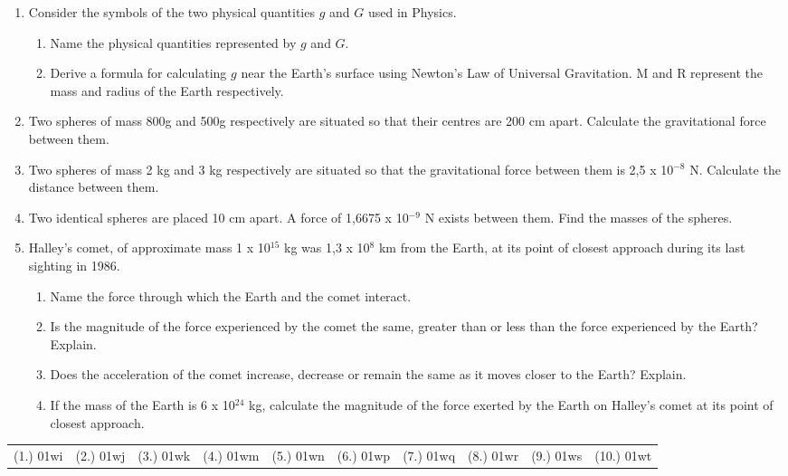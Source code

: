 {\begin{enumerate}
\item {Consider the symbols of the two physical quantities $g$ and $G$ used in Physics.
\begin{enumerate}
\item Name the physical quantities represented by $g$ and $G$.
\item Derive a formula for calculating $g$ near the Earth's surface using Newton's Law of Universal Gravitation. M and R represent the mass and radius of the Earth respectively.
\end{enumerate}
}

\item {Two spheres of mass 800g and 500g respectively are situated so that their centres are 200 cm apart. Calculate the gravitational force between them.}

\item {Two spheres of mass 2 kg and 3 kg respectively are situated so that the gravitational force between them is 2,5 x 10$^{-8}$ N. Calculate the distance between them.}

\item {Two identical spheres are placed 10 cm apart. A force of 1,6675 x 10$^{-9}$ N exists between them. Find the masses of the spheres.}

\item {Halley's comet, of approximate mass 1 x 10$^{15}$ kg was 1,3 x 10$^8$ km from the Earth,
at its point of closest approach during its last sighting in 1986.
\begin{enumerate}
\item Name the force through which the Earth and the comet interact.
\item Is the magnitude of the force experienced by the comet the same, greater than or less than the force experienced by the Earth? Explain.
\item Does the acceleration of the comet increase, decrease or remain the same as it moves closer to the Earth? Explain.
\item If the mass of the Earth is 6 x 10$^{24}$ kg, calculate the magnitude of the force exerted by the Earth on Halley's comet at its point of closest approach.
\end{enumerate}
}

\end{enumerate}
\practiceinfo

\begin{tabular}[h]{cccccc}
(1.) 01wi & (2.) 01wj & (3.) 01wk & (4.) 01wm & (5.) 01wn & (6.) 01wp & (7.) 01wq & (8.) 01wr & (9.) 01ws & (10.) 01wt & 
 \end{tabular}
}

